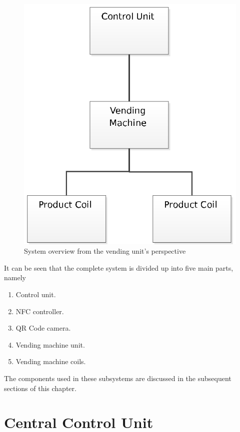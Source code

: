 \begin{figure}[h]
\centering
\includegraphics[trim=110 0 0 110, scale=0.7]{vending_machine_system_overview.eps}
\caption{System overview from the vending unit's perspective}
\label{fig:system-overview-machine}
\end{figure}

It can be seen that the complete system is divided up into five main parts, namely 

\begin{enumerate}
  \item Control unit.
  \item NFC controller.
  \item QR Code camera.
  \item Vending machine unit.
  \item Vending machine coils.
\end{enumerate}

The components used in these subsystems are discussed in the subsequent sections of this
chapter.

\section{Central Control Unit}


